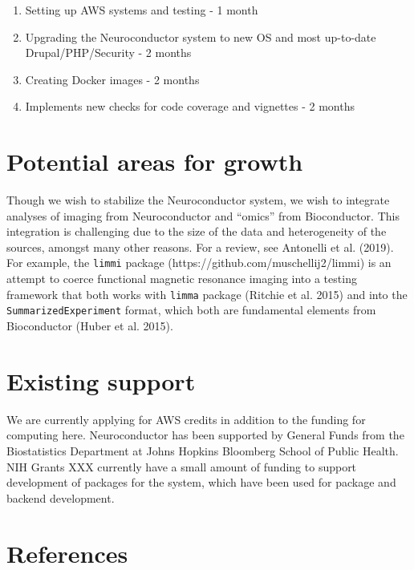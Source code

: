 \documentclass[]{elsarticle} %
\providecommand{\tightlist}{%
  \setlength{\itemsep}{0pt}\setlength{\parskip}{0pt}}
\begin{document}
\begin{enumerate}
\def\labelenumi{\arabic{enumi}.}
\tightlist
\item
  Setting up AWS systems and testing - 1 month
\item
  Upgrading the Neuroconductor system to new OS and most up-to-date Drupal/PHP/Security - 2 months
\item
  Creating Docker images - 2 months
\item
  Implements new checks for code coverage and vignettes - 2 months
\end{enumerate}

\hypertarget{potential-areas-for-growth}{%
\section{Potential areas for growth}\label{potential-areas-for-growth}}

Though we wish to stabilize the Neuroconductor system, we wish to integrate analyses of imaging from Neuroconductor and ``omics'' from Bioconductor. This integration is challenging due to the size of the data and heterogeneity of the sources, amongst many other reasons. For a review, see Antonelli et al. (2019). For example, the \texttt{limmi} package (https://github.com/muschellij2/limmi) is an attempt to coerce functional magnetic resonance imaging into a testing framework that both works with \texttt{limma} package (Ritchie et al. 2015) and into the \texttt{SummarizedExperiment} format, which both are fundamental elements from Bioconductor (Huber et al. 2015).

\hypertarget{existing-support}{%
\section{Existing support}\label{existing-support}}

We are currently applying for AWS credits in addition to the funding for computing here. Neuroconductor has been supported by General Funds from the Biostatistics Department at Johns Hopkins Bloomberg School of Public Health. NIH Grants XXX currently have a small amount of funding to support development of packages for the system, which have been used for package and backend development.

\hypertarget{references}{%
\section*{References}\label{references}}
\end{document}
